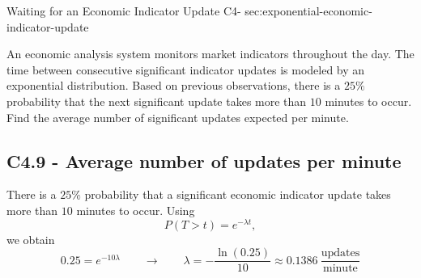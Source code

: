 	\sectionScored
	{Waiting for an Economic Indicator Update}
	{C4-}
	{sec:exponential-economic-indicator-update}
	{
		An economic analysis system monitors market indicators throughout the
		day. The time between consecutive significant indicator updates is
		modeled by an exponential distribution. Based on previous observations,
		there is a \(25\%\) probability that the next significant update takes
		more than \(10\) minutes to occur. Find the average number of significant
		updates expected per minute.
		
		
		\subsection*{C4.9 - Average number of updates per minute}
		\label{subsec:c4-find-rate-economic-update}
		
		There is a \(25\%\) probability that a significant economic indicator
		update takes more than \(10\) minutes to occur. Using
		\[
		P(T>t)=e^{-\lambda t},
		\]
		we obtain
		\[
		0.25=e^{-10\lambda}
		\qquad \longrightarrow \qquad
		\lambda=-\frac{\ln(0.25)}{10}
		\approx \boxed{0.1386\>\frac{\text{updates}}{\text{minute}}}
		\]
		\vspace{-5mm}
	}
	

